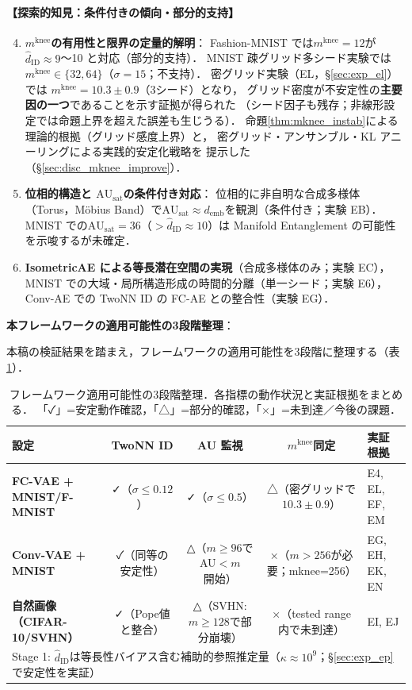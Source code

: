 \documentclass[11pt,a4paper]{jsarticle}
\newcommand{\kap}{\kappa}
\newcommand{\AUsat}{\mathrm{AU}_{\mathrm{sat}}}
\newcommand{\mknee}{m^{\mathrm{knee}}}
\newcommand{\demb}{d_{\mathrm{emb}}}
\begin{document}
\paragraph{【探索的知見：条件付きの傾向・部分的支持】}
\begin{enumerate}
  \setcounter{enumi}{3}
  \item \textbf{$\mknee$の有用性と限界の定量的解明}：
        Fashion-MNIST では$\mknee = 12$が$\hat{d}_\mathrm{ID} \approx 9$〜10 と対応（部分的支持）．
        MNIST 疎グリッド多シード実験では$\mknee \in \{32, 64\}$（$\sigma=15$；不支持）．
        密グリッド実験（EL，§\ref{sec:exp_el}）では
        $\mknee = 10.3 \pm 0.9$（3シード）となり，
        グリッド密度が不安定性の\textbf{主要因の一つ}であることを示す証拠が得られた
        （シード因子も残存；非線形設定では命題上界を超えた誤差も生じうる）．
        命題\ref{thm:mknee_instab}による理論的根拠（グリッド感度上界）と，
        密グリッド・アンサンブル・KL アニーリングによる実践的安定化戦略を
        提示した（§\ref{sec:disc_mknee_improve}）．
  \item \textbf{位相的構造と $\AUsat$の条件付き対応}：
        位相的に非自明な合成多様体（Torus，Möbius Band）で$\AUsat \approx \demb$を観測（条件付き；実験 EB）．
        MNIST での$\AUsat = 36$（$> \hat{d}_\mathrm{ID} \approx 10$）は Manifold Entanglement の可能性を示唆するが未確定．
  \item \textbf{IsometricAE による等長潜在空間の実現}（合成多様体のみ；実験 EC），
        MNIST での大域・局所構造形成の時間的分離（単一シード；実験 E6），
        Conv-AE での TwoNN ID の FC-AE との整合性（実験 EG）．
\end{enumerate}

\textbf{本フレームワークの適用可能性の3段階整理}：

本稿の検証結果を踏まえ，フレームワークの適用可能性を3段階に整理する（表\ref{tab:applicability_tier}）．

\begin{table}[H]
\centering
\caption{フレームワーク適用可能性の3段階整理．各指標の動作状況と実証根拠をまとめる．
「✓」=安定動作確認，「△」=部分的確認，「×」=未到達／今後の課題．}
\label{tab:applicability_tier}
\small
\begin{tabular}{lcccp{3.8cm}}
\toprule
設定 & TwoNN ID & AU 監視 & $\mknee$同定 & 実証根拠 \\
\midrule
\textbf{FC-VAE + MNIST/F-MNIST}
  & ✓（$\sigma\leq0.12$）
  & ✓（$\sigma\leq0.5$）
  & △（密グリッドで$10.3\pm0.9$）
  & E4, EL, EF, EM \\
\addlinespace
\textbf{Conv-VAE + MNIST}
  & ✓（同等の安定性）
  & △（$m\geq96$で AU$<m$開始）
  & ×（$m>256$が必要；mknee=256）
  & EG, EH, EK, EN \\
\addlinespace
\textbf{自然画像（CIFAR-10/SVHN）}
  & ✓（Pope値と整合）
  & △（SVHN: $m\geq128$で部分崩壊）
  & ×（tested range 内で未到達）
  & EI, EJ \\
\midrule
\multicolumn{5}{l}{\small Stage 1: $\hat{d}_\mathrm{ID}$は等長性バイアス含む補助的参照推定量（$\kap\approx10^9$；§\ref{sec:exp_ep}で安定性を実証）}\\
\bottomrule
\end{tabular}
\end{table}
\end{document}
